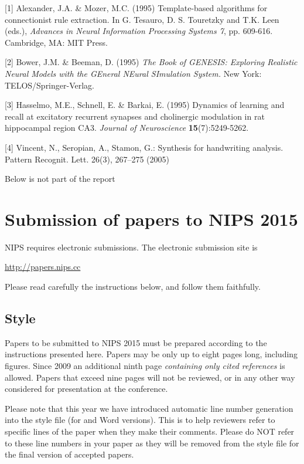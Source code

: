 \documentclass{article} %
\begin{document}
\small{
[1] Alexander, J.A. \& Mozer, M.C. (1995) Template-based algorithms
for connectionist rule extraction. In G. Tesauro, D. S. Touretzky
and T.K. Leen (eds.), {\it Advances in Neural Information Processing
Systems 7}, pp. 609-616. Cambridge, MA: MIT Press.

[2] Bower, J.M. \& Beeman, D. (1995) {\it The Book of GENESIS: Exploring
Realistic Neural Models with the GEneral NEural SImulation System.}
New York: TELOS/Springer-Verlag.

[3] Hasselmo, M.E., Schnell, E. \& Barkai, E. (1995) Dynamics of learning
and recall at excitatory recurrent synapses and cholinergic modulation
in rat hippocampal region CA3. {\it Journal of Neuroscience}
{\bf 15}(7):5249-5262.
}

[4] Vincent, N., Seropian, A., Stamon, G.: Synthesis for handwriting
analysis. Pattern Recognit. Lett. 26(3), 267–275 (2005)



Below is not part of the report

\section{Submission of papers to NIPS 2015}

NIPS requires electronic submissions.  The electronic submission site is  
\begin{center}
   \url{http://papers.nips.cc}
\end{center}

Please read carefully the
instructions below, and follow them faithfully.
\subsection{Style}

Papers to be submitted to NIPS 2015 must be prepared according to the
instructions presented here. Papers may be only up to eight pages long,
including figures. Since 2009 an additional ninth page \textit{containing only
cited references} is allowed. Papers that exceed nine pages will not be
reviewed, or in any other way considered for presentation at the conference.

Please note that this year we have introduced automatic line number generation
into the style file (for \LaTeXe and Word versions). This is to help reviewers
refer to specific lines of the paper when they make their comments. Please do
NOT refer to these line numbers in your paper as they will be removed from the
style file for the final version of accepted papers.
\end{document}
